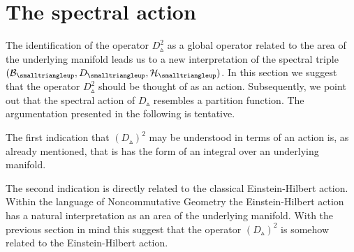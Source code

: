 \documentclass[12pt]{article}
\def\ca{{\cal A}}
\def\cb{{\cal B}}
\def\ch{{\cal H}}
\begin{document}

















\section{The spectral action}
\label{EINstein}

The identification of the operator $D^2_{\smalltriangleup}$ as a global operator related to the area of the underlying manifold leads us to a new interpretation of the spectral triple $(\cb_{\smalltriangleup},D_{\smalltriangleup},\ch_\smalltriangleup)$. In this section we suggest that the operator $D^2_{\smalltriangleup}$ should be thought of as an action. Subsequently, we point out that the spectral action of $D_{\smalltriangleup}$ resembles a partition function. The argumentation presented in the following is tentative.

The first indication that $(D_{\smalltriangleup})^2$ may be understood in terms of an action is, as already mentioned, that is has the form of an integral over an underlying manifold. 
 
The second indication is directly related to the classical Einstein-Hilbert action. Within the language of Noncommutative Geometry the Einstein-Hilbert action has a natural interpretation as an area of the underlying manifold. With the previous section in mind this suggest that the operator $(D_{\smalltriangleup})^2$ is somehow related to the Einstein-Hilbert action. 
\end{document}
